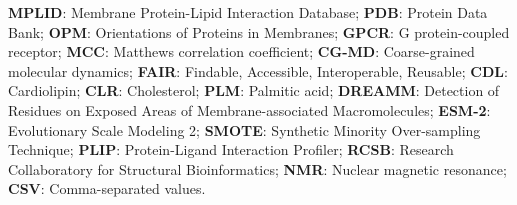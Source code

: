 \documentclass[unnumsec,webpdf,contemporary,large]{oup-authoring-template}
\begin{document}
\noindent
\textbf{MPLID}: Membrane Protein-Lipid Interaction Database;
\textbf{PDB}: Protein Data Bank;
\textbf{OPM}: Orientations of Proteins in Membranes;
\textbf{GPCR}: G protein-coupled receptor;
\textbf{MCC}: Matthews correlation coefficient;
\textbf{CG-MD}: Coarse-grained molecular dynamics;
\textbf{FAIR}: Findable, Accessible, Interoperable, Reusable;
\textbf{CDL}: Cardiolipin;
\textbf{CLR}: Cholesterol;
\textbf{PLM}: Palmitic acid;
\textbf{DREAMM}: Detection of Residues on Exposed Areas of Membrane-associated Macromolecules;
\textbf{ESM-2}: Evolutionary Scale Modeling 2;
\textbf{SMOTE}: Synthetic Minority Over-sampling Technique;
\textbf{PLIP}: Protein-Ligand Interaction Profiler;
\textbf{RCSB}: Research Collaboratory for Structural Bioinformatics;
\textbf{NMR}: Nuclear magnetic resonance;
\textbf{CSV}: Comma-separated values.





\end{document}
